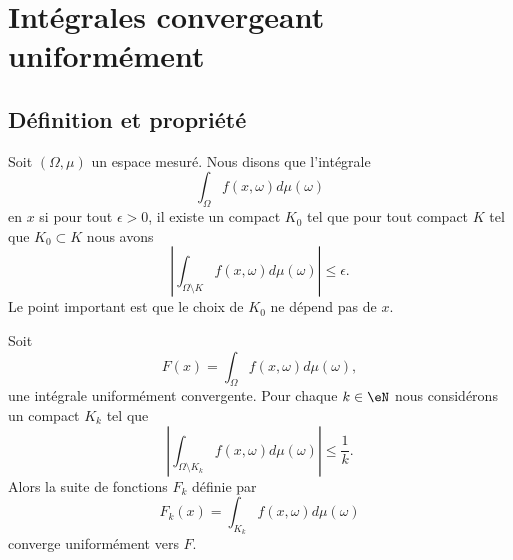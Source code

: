 
\section{Intégrales convergeant uniformément}

\subsection{Définition et propriété}

Soit \( (\Omega,\mu)\) un espace mesuré. Nous disons que l'intégrale
\begin{equation}
    \int_{\Omega}f(x,\omega)d\mu(\omega)
\end{equation}
 en \( x\) si pour tout \( \epsilon>0\), il existe un compact \( K_0\) tel que pour tout compact \( K\) tel que \( K_0\subset K\) nous avons
\begin{equation}
    \left| \int_{\Omega\setminus K}f(x,\omega)d\mu(\omega) \right| \leq \epsilon.
\end{equation}
Le point important est que le choix de \( K_0\) ne dépend pas de \( x\).

\begin{lemma}       \label{LemOgQdpJ}
    Soit
    \begin{equation}
        F(x)=\int_{\Omega}f(x,\omega)d\mu(\omega),
    \end{equation}
    une intégrale uniformément convergente. Pour chaque \( k\in \eN\) nous considérons un compact \( K_k\) tel que
    \begin{equation}
        \left| \int_{\Omega\setminus K_k}f(x,\omega)d\mu(\omega) \right| \leq\frac{1}{ k }.
    \end{equation}
    Alors la suite de fonctions \( F_k\) définie par
    \begin{equation}
        F_k(x)=\int_{K_k}f(x,\omega)d\mu(\omega)
    \end{equation}
    converge uniformément vers \( F\).
\end{lemma}

